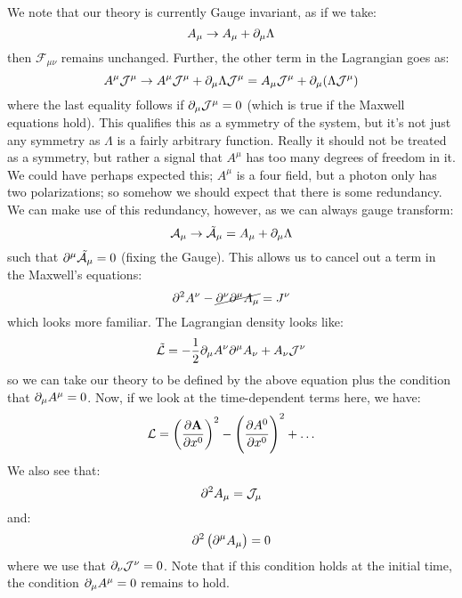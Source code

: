 We note that our theory is currently Gauge invariant, as if we take:
\begin{equation}
    A_\mu \to A_\mu + \partial_\mu \Lambda
\end{equation}
then $\mathcal{F}_{\mu\nu}$ remains unchanged. Further, the other term in the Lagrangian goes as:
\begin{equation}
    A^\mu \mathcal{J}^\mu \to A^\mu \mathcal{J}^\mu + \partial_\mu \Lambda \mathcal{J}^\mu = A_\mu \mathcal{J}^\mu + \partial_\mu (\Lambda \mathcal{J}^\mu)
\end{equation}
where the last equality follows if $\partial_\mu \mathcal{J}^\mu = 0$ (which is true if the Maxwell equations hold). This qualifies this as a symmetry of the system, but it's not just any symmetry as $\Lambda$ is a fairly arbitrary function. Really it should not be treated as a symmetry, but rather a signal that $A^{\mu}$ has too many degrees of freedom in it. We could have perhaps expected this; $A^{\mu}$ is a four field, but a photon only has two polarizations; so somehow we should expect that there is some redundancy. We can make use of this redundancy, however, as we can always gauge transform:
\begin{equation}
    \mathcal{A}_\mu \to \tilde{\mathcal{A}}_\mu = A_\mu + \partial_\mu \Lambda
\end{equation}
such that $\partial^\mu \tilde{\mathcal{A}_\mu} = 0$ (fixing the Gauge). This allows us to cancel out a term in the Maxwell's equations:
\begin{equation}
    \partial^2 A^\nu - \cancel{\partial^\nu \partial^\mu A_\mu} = J^\nu 
\end{equation}
which looks more familiar. The Lagrangian density looks like:
\begin{equation}
    \tilde{\mathcal{L}} = -\frac{1}{2}\partial_\mu A^\nu \partial^\mu A_\nu + A_\nu \mathcal{J}^\nu
\end{equation}
so we can take our theory to be defined by the above equation plus the condition that $\partial_\mu A^\mu = 0$. Now, if we look at the time-dependent terms here, we have:
\begin{equation}
    \mathcal{L} = \left(\frac{\partial \mathbf{A}}{\partial x^0}\right)^2 - \left(\frac{\partial A^0}{\partial x^0}\right)^2 + \ldots
\end{equation}
We also see that:
\begin{equation}
    \partial^2 A_\mu = \mathcal{J}_\mu
\end{equation}
and:
\begin{equation}
    \partial^2\left(\partial^\mu A_\mu\right) = 0
\end{equation}
where we use that $\partial_\nu \mathcal{J}^\nu = 0$. Note that if this condition holds at the initial time, the condition $\partial_\mu A^\mu = 0$ remains to hold.

